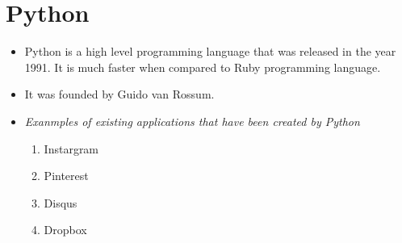 \documentclass{article}
\begin{document}
	\section{Python}
	
	\begin{itemize}
		\item Python is a high level programming language that was released in the year 1991. It is much faster when compared to Ruby programming language.
		\item It was founded by Guido van Rossum.
		\item \textit{Exanmples of existing applications that have been created by Python}
			\begin{enumerate}
				\item Instargram
				\item Pinterest
				\item Disqus
				\item Dropbox
			\end{enumerate}
	\end{itemize}
\end{document}
